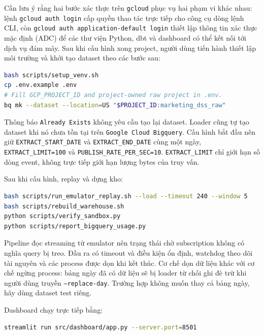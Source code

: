 Cần lưu ý rằng hai bước xác thực trên \texttt{gcloud} phục vụ hai phạm vi khác nhau: lệnh \texttt{gcloud auth login} cấp quyền thao tác trực tiếp cho công cụ dòng lệnh CLI, còn \texttt{gcloud auth application-default login} thiết lập thông tin xác thực mặc định (ADC) để các thư viện Python, dbt và dashboard có thể kết nối tới dịch vụ đám mây. Sau khi cấu hình xong project, người dùng tiến hành thiết lập môi trường và khởi tạo dataset theo các bước sau: \medskip

\begin{lstlisting}[language=bash,basicstyle=\ttfamily\small]
bash scripts/setup_venv.sh
cp .env.example .env
# Fill GCP_PROJECT_ID and project-owned raw project in .env.
bq mk --dataset --location=US "$PROJECT_ID:marketing_dss_raw"
\end{lstlisting}\medskip

Thông báo \texttt{Already Exists} không yêu cầu tạo lại dataset. Loader cũng tự tạo dataset khi nó chưa tồn tại trên \texttt{Google Cloud Bigquery}. Cấu hình bắt đầu nên giữ \texttt{EXTRACT\_START\_DATE} và \texttt{EXTRACT\_END\_DATE} cùng một ngày, \texttt{EXTRACT\_LIMIT=100} và \texttt{PUBLISH\_RATE\_PER\_SEC=10}. \texttt{EXTRACT\_LIMIT} chỉ giới hạn số dòng event, không trực tiếp giới hạn lượng bytes của truy vấn. \medskip

Sau khi cấu hình, replay và dựng kho: \medskip

\begin{lstlisting}[language=bash,basicstyle=\ttfamily\small]
bash scripts/run_emulator_replay.sh --load --timeout 240 --window 5
bash scripts/rebuild_warehouse.sh
python scripts/verify_sandbox.py
python scripts/report_bigquery_usage.py
\end{lstlisting} \medskip

Pipeline đọc streaming từ emulator nên trạng thái chờ subscription không có nghĩa query bị treo. Đầu ra có timeout và điều kiện ổn định, watchdog theo dõi tài nguyên và các process được dọn khi kết thúc. Cơ chế dọn dữ liệu khác với cơ chế ngừng process: bảng ngày đã có dữ liệu sẽ bị loader từ chối ghi đè trừ khi người dùng truyền \texttt{--replace-day}. Trường hợp không muốn thay cả bảng ngày, hãy dùng dataset test riêng. \medskip

Dashboard chạy trực tiếp bằng: \medskip

\begin{lstlisting}[language=bash,basicstyle=\ttfamily\small]
streamlit run src/dashboard/app.py --server.port=8501
\end{lstlisting} \medskip

